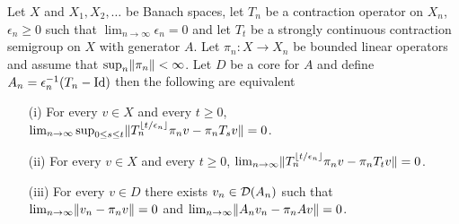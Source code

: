 \begin{thm}\label{KurtzDiscreteTimeSemigroupConvergence}Let $X$ and $X_1, X_2, \dotsc$ be Banach spaces, let $T_{n}$ be a contraction operator on $X_n$, $\epsilon_n \geq 0 $ such that $\lim_{n\to \infty} \epsilon_n = 0$ and let $T_t$ be a strongly continuous contraction semigroup on $X$ with generator $A$.  Let $\pi_n : X \to X_n$ be bounded linear operators and assume that $\sup_{n} \lVert \pi_n \rVert < \infty$.  Let $D$ be a
core for $A$ and define $A_n = \epsilon_n^{-1}(T_n-\operatorname*{Id})$ then the following are equivalent
\begin{itemize}
\item[(i)]For every $v \in X$ and every $t \geq 0$,  $\lim_{n \to \infty} \sup_{0 \leq s \leq t} \lVert T^{\lfloor t/\epsilon_n \rfloor}_{n} \pi_n v - \pi_n T_s v \rVert = 0$.
\item[(ii)]For every $v \in X$ and every $t \geq 0$,  $\lim_{n \to \infty} \lVert T^{\lfloor t/\epsilon_n \rfloor}_{n} \pi_n v - \pi_n T_t v \rVert = 0$.
\item[(iii)] For every $v \in D$ there exists $v_n \in \mathcal{D}(A_n)$ such that $\lim_{n \to \infty} \lVert v_n - \pi_n v \rVert = 0$ and $\lim_{n \to \infty} \lVert A_n v_n - \pi_n A v \rVert = 0$.
\end{itemize}
\end{thm}
